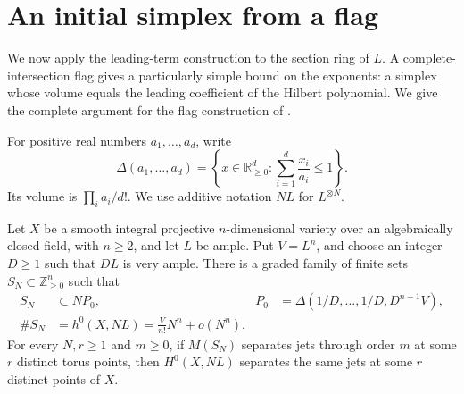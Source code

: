 \section{An initial simplex from a flag}\label{sec:flag}

We now apply the leading-term construction to the section ring of $L$. A complete-intersection flag gives a particularly simple bound on the exponents: a simplex whose volume equals the leading coefficient of the Hilbert polynomial.  We give the complete argument for the flag construction of \cite[Section~3]{OpenAI2026Higher}.

For positive real numbers $a_1,\ldots,a_d$, write
\[
 \Delta(a_1,\ldots,a_d)
 =\left\{x\in\mathbb{R}_{\geq0}^d:
       \sum_{i=1}^d\frac{x_i}{a_i}\leq1\right\}.
\]
Its volume is $\prod_i a_i/d!$.  We use additive notation $NL$ for $L^{\otimes N}$.

\begin{proposition}\label{prop:initial-simplex}
Let $X$ be a smooth integral projective $n$-dimensional variety over an algebraically closed field, with $n\geq2$, and let $L$ be ample.  Put $V=L^n$, and choose an integer $D\geq1$ such that $DL$ is very ample. There is a graded family of finite sets $S_N\subset\mathbb{Z}_{\geq0}^n$ such that
\begin{align}
 S_N&\subset NP_0,
 &P_0&=\Delta(1/D,\ldots,1/D,D^{n-1}V),
 \label{eq:initial-simplex}\\
 \#S_N&=h^0(X,NL)
       =\frac{V}{n!}N^n+o(N^n).
 \label{eq:initial-dimension}
\end{align}
For every $N,r\geq1$ and $m\geq0$, if $M(S_N)$ separates jets through order $m$ at some $r$ distinct torus points, then $H^0(X,NL)$ separates the same jets at some $r$ distinct points of $X$.
\end{proposition}

